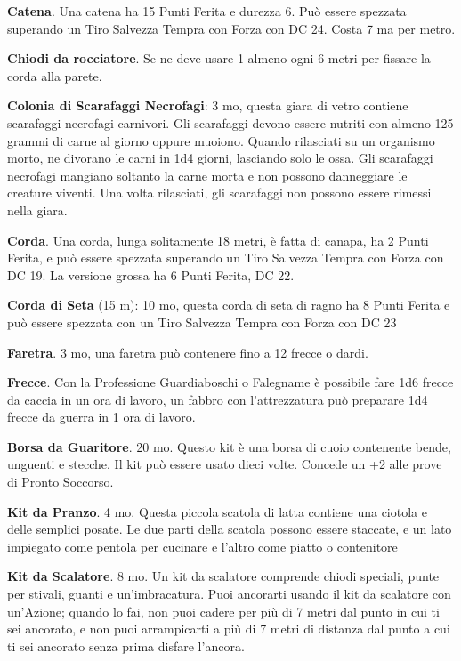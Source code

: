 \begin{multicols}{2}
\textbf{Catena}\hypertarget{Catena}{}. Una catena ha 15 Punti Ferita e durezza 6. Può essere spezzata superando un Tiro Salvezza Tempra con Forza con DC 24. Costa 7 ma per metro.

\textbf{Chiodi da rocciatore}. Se ne deve usare 1 almeno ogni 6 metri per fissare la corda alla parete.

\textbf{Colonia di Scarafaggi Necrofagi}: 3 mo, questa giara di vetro contiene scarafaggi necrofagi carnivori. Gli scarafaggi devono essere nutriti con almeno 125 grammi di carne al giorno oppure muoiono. Quando rilasciati su un organismo morto, ne divorano le carni in 1d4 giorni, lasciando solo le ossa. Gli scarafaggi necrofagi mangiano soltanto la carne morta e non possono danneggiare le creature viventi. Una volta rilasciati, gli scarafaggi non possono essere rimessi nella giara.

\textbf{Corda}. Una corda, lunga solitamente 18 metri, è fatta di canapa, ha 2 Punti Ferita, e può essere spezzata superando un Tiro Salvezza Tempra con Forza con DC 19. La versione grossa ha 6 Punti Ferita, DC 22.\label{Corda}\hypertarget{Corda}{}

\textbf{Corda di Seta} (15 m): 10 mo, questa corda di seta di ragno ha 8 Punti Ferita e può essere spezzata con un Tiro Salvezza Tempra con Forza con DC 23

\textbf{Faretra}. 3 mo, una faretra può contenere fino a 12 frecce o dardi.\label{Faretra}\hypertarget{Faretra}{}

\textbf{Frecce}. Con la Professione Guardiaboschi o Falegname è possibile fare 1d6 frecce da caccia in un ora di lavoro, un fabbro con l'attrezzatura può preparare 1d4 frecce da guerra in 1 ora di lavoro.

\textbf{Borsa da Guaritore}. 20 mo. \label{borsadaguaritore}\hypertarget{borsadaguaritore}{} Questo kit è una borsa di cuoio contenente bende, unguenti e stecche. Il kit può essere usato dieci volte. Concede un +2 alle prove di Pronto Soccorso.

\textbf{Kit da Pranzo}. 4 mo. Questa piccola scatola di latta contiene una ciotola e delle semplici posate. Le due parti della scatola possono essere staccate, e un lato impiegato come pentola per cucinare e l'altro come piatto o contenitore

\textbf{Kit da Scalatore}. 8 mo. Un kit da scalatore comprende chiodi speciali, punte per stivali, guanti e un'imbracatura. Puoi ancorarti usando il kit da scalatore con un'Azione; quando lo fai, non puoi cadere per più di 7 metri dal punto in cui ti sei ancorato, e non puoi arrampicarti a più di 7 metri di distanza dal punto a cui ti sei ancorato senza prima disfare l'ancora.


\end{multicols}
